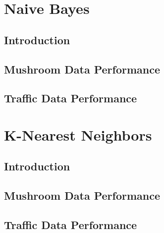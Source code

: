 \documentclass{article}
\begin{document}
\section{Naive Bayes}
\subsection{Introduction}
\subsection{Mushroom Data Performance}
\subsection{Traffic Data Performance}
\section{K-Nearest Neighbors}
\subsection{Introduction}
\subsection{Mushroom Data Performance}
\subsection{Traffic Data Performance}
\end{document}
